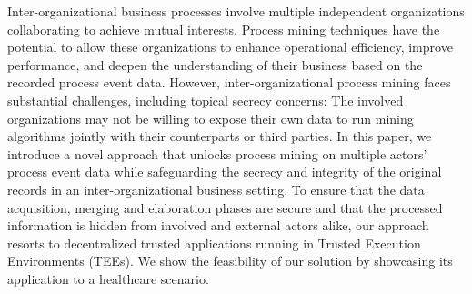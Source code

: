 Inter-organizational business processes involve multiple independent organizations collaborating to achieve mutual interests. 
Process mining techniques have the potential to allow these organizations to enhance operational efficiency, improve performance, and deepen the understanding of their business based on the recorded process event data. 
However, inter-organizational process mining faces substantial challenges, including topical secrecy concerns: The involved organizations may not be willing to expose their own data to run mining algorithms jointly with their counterparts or third parties. 
In this paper, we introduce a novel approach that unlocks process mining on multiple actors' process event data while safeguarding the secrecy and integrity of the original records in an inter-organizational business setting.
To ensure that the data acquisition, merging and elaboration phases are secure and that the processed information is hidden from involved and external actors alike, our approach resorts to decentralized trusted applications running in Trusted Execution Environments (TEEs).
We show the feasibility of our solution by showcasing its application to a healthcare scenario.
%
\begin{comment}%
 Through process mining tecniques, organizations enhances their operational efficiency, improve performances, and deepen the understanding of their business processes. While most process mining research focuses on intra-organizational settings, the emerging importance of inter-organizational collaborations for operational excellence cannot be ignored. Inter-organizational business processes involve multiple independent organizations collaborating to achieve mutual interests. However, inter-organizational process mining faces substantial challenges, primarily centered on confidentiality concerns. In this paper, we introduce a novel approach based on the adoption of trusted applications running in Trusted Execution Environments (TEEs). Our research work aims at ensuring privacy preservation and safeguarding the integrity of sensitive information during process mining procedures in inter-organizational contexts. Therefore, we introduce a TEE-based infrastructure supporting the execution of trusted applications through which partner organizations securely share operational information and apply process mining techniques. We show the feasibility of our solution by exposing an healthcare scenario that serve as running example. Our contribution includes a discussion of the proposed research work that addresses strengths and areas for improvement.
\end{comment}
